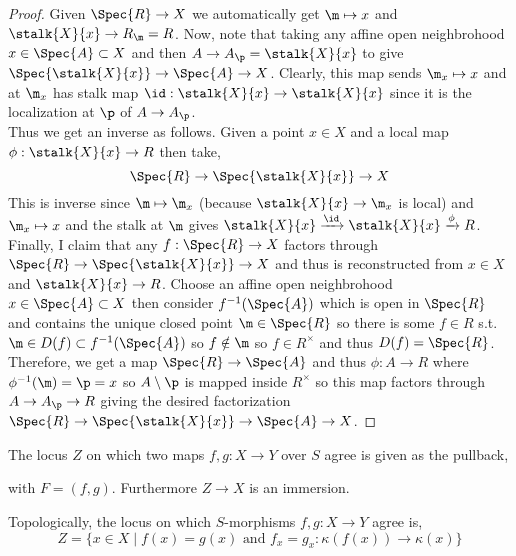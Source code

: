 \documentclass[12pt]{article}
\begin{document}
\begin{proof}
Given $\Spec{R} \to X$ we automatically get $\m \mapsto x$ and $\stalk{X}{x} \to R_\m = R$. 
Now, note that taking any affine open neighbrohood $x \in \Spec{A} \subset X$ and then $A \to A_\p = \stalk{X}{x}$ to give $\Spec{\stalk{X}{x}} \to \Spec{A} \to X$. Clearly, this map sends $\m_x \mapsto x$ and at $\m_x$ has stalk map $\id : \stalk{X}{x} \to \stalk{X}{x}$ since it is the localization at $\p$ of $A \to A_\p$. 
\bigskip\\
Thus we get an inverse as follows. Given a point $x \in X$ and a local map $\phi : \stalk{X}{x} \to R$ then take,
\[ \Spec{R} \to \Spec{\stalk{X}{x}} \to X \]
This is inverse since $\m \mapsto \m_x$ (because $\stalk{X}{x} \to \m_x$ is local) and $\m_x \mapsto x$ and the stalk at $\m$ gives $\stalk{X}{x} \xrightarrow{\id} \stalk{X}{x} \xrightarrow{\phi} R$. 
\bigskip\\
Finally, I claim that any $f : \Spec{R} \to X$ factors through $\Spec{R} \to \Spec{\stalk{X}{x}} \to X$ and thus is reconstructed from $x \in X$ and $\stalk{X}{x} \to R$. Choose an affine open neighbrohood $x \in \Spec{A} \subset X$ then consider $f^{-1}(\Spec{A})$ which is open in $\Spec{R}$ and contains the unique closed point $\m \in \Spec{R}$ so there is some $f \in R$ s.t. $\m \in D(f) \subset f^{-1}(\Spec{A})$ so $f \notin \m$ so $f \in R^\times$ and thus $D(f) = \Spec{R}$. Therefore, we get a map $\Spec{R} \to \Spec{A}$ and thus $\phi : A \to R$ where $\phi^{-1}(\m) = \p = x$ so $A \setminus \p$ is mapped inside $R^\times$ so this map factors through $A \to A_\p \to R$ giving the desired factorization $\Spec{R} \to \Spec{\stalk{X}{x}} \to \Spec{A} \to X$.  
\end{proof}

\begin{definition}
The locus $Z$ on which two maps $f, g : X \to Y$ over $S$ agree is given as the pullback,
\begin{center}
\end{center}
with $F = (f, g)$. Furthermore $Z \to X$ is an immersion. 
\end{definition}

\begin{lemma}
Topologically, the locus on which $S$-morphisms $f, g : X \to Y$ agree is,
\[ Z = \{ x \in X \mid f(x) = g(x) \text{ and } f_x = g_x : \kappa(f(x)) \to \kappa(x) \} \]
\end{lemma}
\end{document}
